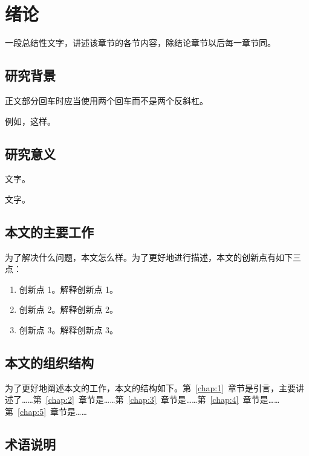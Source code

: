 \documentclass[14pt]{jnuthesis}
\begin{document}
\tableofcontents

\chapter{绪论}\setcounter{page}{1} %
\label{chap:1}

一段总结性文字，讲述该章节的各节内容，除结论章节以后每一章节同。

\section{研究背景}

正文部分回车时应当使用两个回车而不是两个反斜杠。

例如，这样。

\section{研究意义}

文字。

文字。

\section{本文的主要工作}


为了解决什么问题，本文怎么样。为了更好地进行描述，本文的创新点有如下三点：

\begin{enumerate}[1）]
	\item 创新点 1。解释创新点 1。
	\item 创新点 2。解释创新点 2。
	\item 创新点 3。解释创新点 3。
\end{enumerate}

\section{本文的组织结构}

为了更好地阐述本文的工作，本文的结构如下。第~\ref{chap:1}~章节是引言，主要讲述了……第~\ref{chap:2}~章节是……第~\ref{chap:3}~章节是……第~\ref{chap:4}~章节是……第~\ref{chap:5}~章节是……


\section{术语说明}
\end{document}

